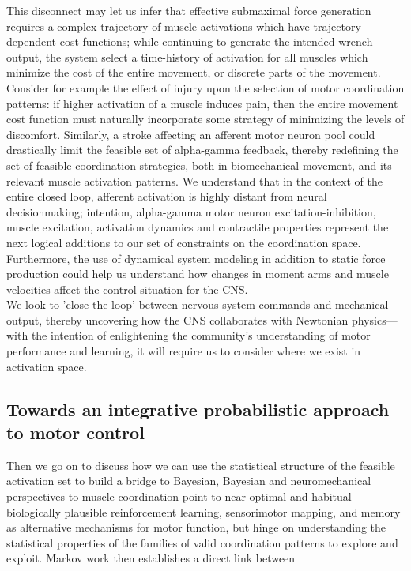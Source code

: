 This disconnect may let us infer that effective submaximal force generation requires a complex trajectory of muscle activations which have trajectory-dependent cost functions; while continuing to generate the intended wrench output, the system select a time-history of activation for all muscles which minimize the cost of the entire movement, or discrete parts of the movement.
Consider for example the effect of injury upon the selection of motor coordination patterns: if higher activation of a muscle induces pain, then the entire movement cost function must naturally incorporate some strategy of minimizing the levels of discomfort. Similarly, a stroke affecting an afferent motor neuron pool could drastically limit the feasible set of alpha-gamma feedback, thereby redefining the set of feasible coordination strategies, both in biomechanical movement, and its relevant muscle activation patterns.
We understand that in the context of the entire closed loop, afferent activation is highly distant from neural decisionmaking;  intention, alpha-gamma motor neuron excitation-inhibition, muscle excitation, activation dynamics and contractile properties represent the next logical additions to our set of constraints on the coordination space. Furthermore, the use of dynamical system modeling in addition to static force production could help us understand how changes in moment arms and muscle velocities affect the control situation for the CNS.\\

We look to 'close the loop' between nervous system commands and mechanical output, thereby uncovering how the CNS collaborates with Newtonian physics--- with the intention of enlightening the community's understanding of motor performance and learning, it will require us to consider where we exist in activation space.

\subsection*{Towards an integrative probabilistic approach to motor control}

Then we go on to discuss how  we can use the statistical structure of the feasible activation set to build a bridge to  Bayesian, Bayesian and neuromechanical perspectives to muscle coordination point to near-optimal and habitual biologically plausible reinforcement learning, sensorimotor mapping, and memory as  alternative mechanisms for motor function, but hinge on understanding the statistical properties of the families of valid coordination patterns to explore and exploit. 
Markov  work then establishes a direct link between 


